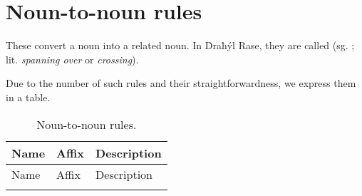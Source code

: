 \documentclass{book}
\begin{document}
\section{Noun-to-noun rules}

These convert a noun into a related noun. In Ḋraħýl Rase, they are called  (sg. ; lit. \emph{spanning over} or \emph{crossing}).

Due to the number of such rules and their straightforwardness, we express them in a table.

\begin{longtabu} to \textwidth {|l|l|Y|}
    \caption{Noun-to-noun rules.} \\
    
    \hline
    Name & Affix & Description \\
    \hline
    \endfirsthead
    
    \hline
    Name & Affix & Description \\
    \hline
    \endhead
    
    \hline
    \endfoot
    
    \hline
    \endlastfoot
    

\end{longtabu}
\end{document}
